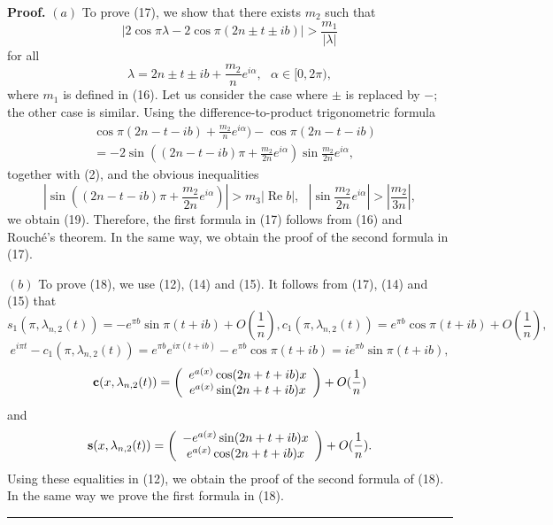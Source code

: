 \documentclass{article}%
\newenvironment{proof}[1][Proof]{\textbf{#1.} }{\ \rule{0.5em}{0.5em}}
\begin{document}
\begin{proof}
$(a)$ To prove (17), we show that there exists $m_{2}$ such that
\begin{equation}
\left\vert 2\cos\pi\lambda-2\cos\pi(2n\pm t\pm ib)\right\vert >\frac{m_{1}%
}{\left\vert \lambda\right\vert } \tag{19}%
\end{equation}
for all
\[
\lambda=2n\pm t\pm ib+\frac{m_{2}}{n}e^{i\alpha},\text{ }\alpha\in
\lbrack0,2\pi),
\]
where $m_{1}$ is defined in (16). Let us consider the case where $\pm$ is
replaced by $-;$ the other case is similar. Using the difference-to-product
trigonometric formula
\begin{align*}
&  \cos\pi(2n-t-ib)+\frac{m_{2}}{n}e^{i\alpha})-\cos\pi(2n-t-ib)\\
&  =-2\sin\left(  (2n-t-ib)\pi+\frac{m_{2}}{2n}e^{i\alpha}\right)  \sin
\frac{m_{2}}{2n}e^{i\alpha},
\end{align*}
together with (2), and the obvious inequalities
\[
\left\vert \sin\left(  (2n-t-ib)\pi+\frac{m_{2}}{2n}e^{i\alpha}\right)
\right\vert >m_{3}\left\vert \operatorname{Re}b\right\vert ,\text{ }\left\vert
\sin\frac{m_{2}}{2n}e^{i\alpha}\right\vert >\left\vert \frac{m_{2}}%
{3n}\right\vert ,
\]
we obtain (19). Therefore, the first formula in (17) follows from (16) and
Rouch\'{e}'s theorem. In the same way, we obtain the proof of the second
formula in (17).

$(b)$ To prove (18), we use (12), (14) and (15). It follows from (17), (14)
and (15) that%
\[
s_{1}(\pi,\lambda_{n,2}(t))=-e^{\pi b}\sin\pi(t+ib)+O(\frac{1}{n}),\text{
}c_{1}(\pi,\lambda_{n,2}(t))=e^{\pi b}\cos\pi(t+ib)+O(\frac{1}{n}),
\]%
\[
e^{i\pi t}-c_{1}(\pi,\lambda_{n,2}(t))=e^{\pi b}e^{i\pi(t+ib)}-e^{\pi b}%
\cos\pi(t+ib)=ie^{\pi b}\sin\pi(t+ib),
\]%
\[
\mathbf{c}(x,\lambda_{n,2}(t))=\left(
\begin{array}
[c]{c}%
e^{a(x)}\cos(2n+t+ib)x\\
e^{a(x)}\sin(2n+t+ib)x
\end{array}
\right)  +O(\frac{1}{n})
\]
and%
\[
\mathbf{s}(x,\lambda_{n,2}(t))=\left(
\begin{array}
[c]{c}%
-e^{a(x)}\sin(2n+t+ib)x\\
e^{a(x)}\cos(2n+t+ib)x
\end{array}
\right)  +O(\frac{1}{n}).
\]
Using these equalities in (12), we obtain the proof of the second formula of
(18). In the same way we prove the first formula in (18).
\end{proof}
\end{document}
